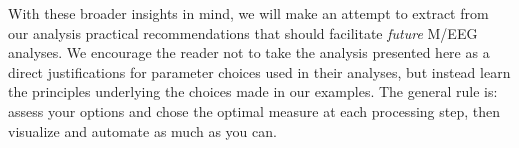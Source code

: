 
With these broader insights in mind, we will make an attempt to extract from our analysis practical recommendations that should facilitate \emph{future} M/EEG analyses. We encourage the reader not to take the analysis presented here as a direct justifications for parameter choices used in their analyses, but instead learn the principles underlying the choices made in our examples. The general rule is: assess your options and chose the optimal measure at each processing step, then visualize and automate as much as you can.

